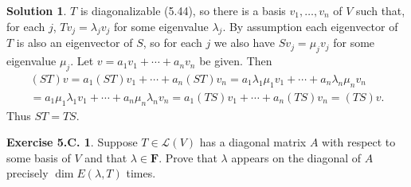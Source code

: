 \documentclass[12pt]{article}
\theoremstyle{definition}
\theoremstyle{exercise}
\newtheorem{exercise}{Exercise 5.C.}
\theoremstyle{solution}
\newtheorem*{solution}{Solution}
\newcommand{\lmap}{\mathcal{L}}
\newcommand{\F}{\mathbf{F}}
\begin{document}
\begin{solution}
    \( T \) is diagonalizable (5.44), so there is a basis \( v_1, \ldots, v_n \) of \( V \) such that, for each \( j \), \( Tv_j = \lambda_j v_j \) for some eigenvalue \( \lambda_j \). By assumption each eigenvector of \( T \) is also an eigenvector of \( S \), so for each \( j \) we also have \( Sv_j = \mu_j v_j \) for some eigenvalue \( \mu_j \). Let \( v = a_1 v_1 + \cdots + a_n v_n \) be given. Then
    \begin{multline*}
        (ST)v = a_1 (ST) v_1 + \cdots + a_n (ST) v_n = a_1 \lambda_1 \mu_1 v_1 + \cdots + a_n \lambda_n \mu_n v_n \\ = a_1 \mu_1 \lambda_1 v_1 + \cdots + a_n \mu_n \lambda_n v_n = a_1 (TS) v_1 + \cdots + a_n (TS) v_n = (TS)v.
    \end{multline*}
    Thus \( ST = TS \).
\end{solution}

\begin{exercise}
\label{ex:7}
    Suppose \( T \in \lmap(V) \) has a diagonal matrix \( A \) with respect to some basis of \( V \) and that \( \lambda \in \F \). Prove that \( \lambda \) appears on the diagonal of \( A \) precisely \( \dim E(\lambda, T) \) times.
\end{exercise}
\end{document}
